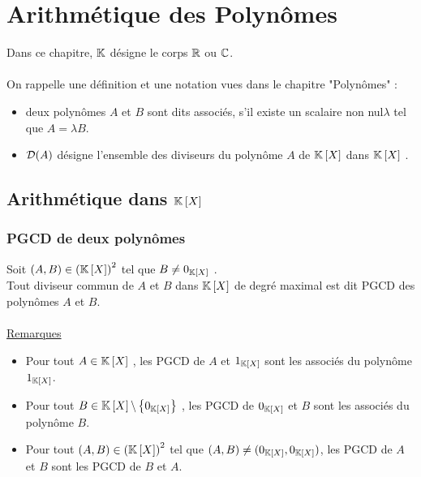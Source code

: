 \chapter{Arithmétique des Polynômes}

\minitoc

Dans ce chapitre, \( \K\) désigne le corps \(\R\) ou \( \C\).\\~\\
On rappelle une définition et une notation vues dans le chapitre "Polynômes" :
\begin{itemize}
    \item  deux polynômes \(A\) et \(B\) sont dits associés, s’il existe un scalaire non nul\( \lambda\)  tel que \(A = \lambda B\).
    \item  \(\cal{D} (A)\) désigne l’ensemble des diviseurs du polynôme \(A\) de \(\K\croch{X}\) dans \(\K\croch{X}\) .
\end{itemize}

\section{Arithmétique dans \(\K\croch{X}\)}
\subsection{PGCD de deux polynômes}
\begin{defi}
    Soit \((A, B) \in \paren{\K\croch{X}}^2\) tel que \(B\neq 0_{\K\croch{X}}\) .\\
    Tout diviseur commun de \(A\) et \(B\) dans \(\K\croch{X}\) de degré maximal est dit PGCD des polynômes \(A\) et \(B\).\\~\\
    \underline{Remarques} \\
    \begin{itemize}
        \item Pour tout \(A \in \K\croch{X}\) , les PGCD de \(A\) et \(1_{\K\croch{X}}\) sont les associés du polynôme \(1_{\K\croch{X}}\).
        \item Pour tout \(B \in \K\croch{X} \pd \accol{0_{\K\croch{X}}}\)  , les PGCD de \(0_{\K\croch{X}}\)  et \(B\) sont les associés du polynôme \(B\).
        \item Pour tout \((A, B) \in \paren{\K\croch{X}}^2\) tel que \((A, B)\neq (0_{\K\croch{X}} , 0_{\K\croch{X}} )\), les PGCD de \(A\) et \(B\) sont les PGCD de \(B\) et \(A\).
    \end{itemize}
\end{defi}

